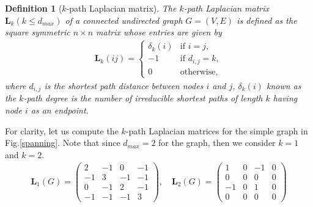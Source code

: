 \documentclass[10pt,a4paper]{article}
\newtheorem{defn}{Definition}
\begin{document}
    	    \begin{defn}[$k$-path Laplacian matrix]
    	    	The $k$-path Laplacian matrix $\mathbf{L}_k(k \leq d_{max})$ of a connected undirected graph $G=(V,E)$ is defined as the square symmetric $n \times n$ matrix whose entries are given by
    	    	\begin{eqnarray}
    	    	\mathbf{L}_k(ij) = \begin{cases} 
    	    	\delta_k(i) &\mbox{if } i = j,  \\
    	    	-1 &\mbox{if } d_{i,j} = k, \\
    	    	0 & \text{otherwise},
    	    	\end{cases}
    	    	\end{eqnarray}\label{k-laplacian}
    	    	where $d_{i,j}$ is the shortest path distance between nodes $i$ and $j$, $\delta_{k}(i)$ known as the $k$-path degree is the number of irreducible shortest paths of length $k$ having node $i$ as an endpoint.	
    	    \end{defn}
            For clarity, let us compute the $k$-path Laplacian matrices for the simple graph in Fig.\ref{spanning}. Note that since $d_{max} = 2$ for the graph, then we consider $k=1$ and $k=2$.	
    	    	\begin{eqnarray*}
    	    		\mathbf{L}_1(G) = \begin{pmatrix}
    	    			2 & -1 & 0 & -1 \\
    	    			-1 & 3 & -1 & -1 \\
    	    			0 & -1 & 2 & -1  \\
    	    			-1 & -1 & -1 & 3
    	    		\end{pmatrix}, \quad
    	    		\mathbf{L}_2(G) = \begin{pmatrix}
    	    			1 & 0 & -1 & 0 \\
    	    			0 & 0 & 0 & 0 \\
    	    			-1 & 0 & 1 & 0 \\
    	    			0 & 0 & 0 & 0
    	    		\end{pmatrix}
    	    	\end{eqnarray*}
    	    
\end{document}
